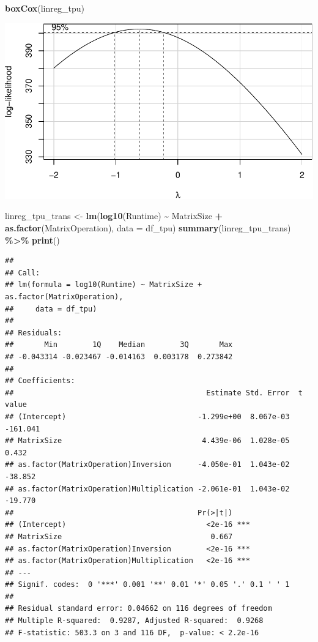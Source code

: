 \documentclass[
]{article}
\newenvironment{Shaded}{\begin{snugshade}}{\end{snugshade}}
\newcommand{\DataTypeTok}[1]{\textcolor[rgb]{0.13,0.29,0.53}{#1}}
\newcommand{\KeywordTok}[1]{\textcolor[rgb]{0.13,0.29,0.53}{\textbf{#1}}}
\newcommand{\NormalTok}[1]{#1}
\newcommand{\OperatorTok}[1]{\textcolor[rgb]{0.81,0.36,0.00}{\textbf{#1}}}
\newcommand{\StringTok}[1]{\textcolor[rgb]{0.31,0.60,0.02}{#1}}
\begin{document}
\begin{Shaded}
\begin{Highlighting}[]
\KeywordTok{boxCox}\NormalTok{(linreg\_tpu)}
\end{Highlighting}
\end{Shaded}

\includegraphics{main_files/figure-latex/unnamed-chunk-13-2.pdf}

\begin{Shaded}
\begin{Highlighting}[]
\NormalTok{linreg\_tpu\_trans \textless{}{-}}\StringTok{ }\KeywordTok{lm}\NormalTok{(}\KeywordTok{log10}\NormalTok{(Runtime) }\OperatorTok{\textasciitilde{}}\StringTok{ }\NormalTok{MatrixSize }\OperatorTok{+}
\StringTok{                         }\KeywordTok{as.factor}\NormalTok{(MatrixOperation), }\DataTypeTok{data =}\NormalTok{ df\_tpu)}
\KeywordTok{summary}\NormalTok{(linreg\_tpu\_trans) }\OperatorTok{\%\textgreater{}\%}\StringTok{ }\KeywordTok{print}\NormalTok{()}
\end{Highlighting}
\end{Shaded}

\begin{verbatim}
## 
## Call:
## lm(formula = log10(Runtime) ~ MatrixSize + as.factor(MatrixOperation), 
##     data = df_tpu)
## 
## Residuals:
##       Min        1Q    Median        3Q       Max 
## -0.043314 -0.023467 -0.014163  0.003178  0.273842 
## 
## Coefficients:
##                                            Estimate Std. Error  t value
## (Intercept)                              -1.299e+00  8.067e-03 -161.041
## MatrixSize                                4.439e-06  1.028e-05    0.432
## as.factor(MatrixOperation)Inversion      -4.050e-01  1.043e-02  -38.852
## as.factor(MatrixOperation)Multiplication -2.061e-01  1.043e-02  -19.770
##                                          Pr(>|t|)    
## (Intercept)                                <2e-16 ***
## MatrixSize                                  0.667    
## as.factor(MatrixOperation)Inversion        <2e-16 ***
## as.factor(MatrixOperation)Multiplication   <2e-16 ***
## ---
## Signif. codes:  0 '***' 0.001 '**' 0.01 '*' 0.05 '.' 0.1 ' ' 1
## 
## Residual standard error: 0.04662 on 116 degrees of freedom
## Multiple R-squared:  0.9287, Adjusted R-squared:  0.9268 
## F-statistic: 503.3 on 3 and 116 DF,  p-value: < 2.2e-16
\end{verbatim}
\end{document}
